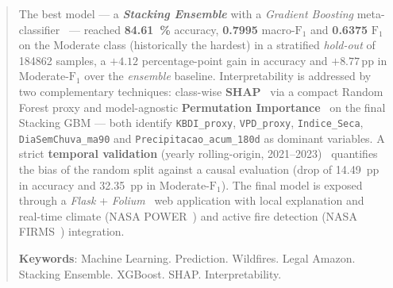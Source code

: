 \begin{abstract}
The best model --- a \textbf{\emph{Stacking Ensemble}} with a \emph{Gradient Boosting} meta-classifier~\cite{friedman2001greedy} --- reached \textbf{\SI{84.61}{\percent}} accuracy, \textbf{0.7995} macro-\(\text{F}_1\) and \textbf{0.6375} \(\text{F}_1\) on the Moderate class (historically the hardest) in a stratified \emph{hold-out} of \num{184862} samples, a \(+4.12\) percentage-point gain in accuracy and \(+8.77\,\text{pp}\) in Moderate-\(\text{F}_1\) over the \emph{ensemble} baseline. Interpretability is addressed by two complementary techniques: class-wise \textbf{SHAP}~\cite{lundberg2017unified,lundberg2020local} via a compact Random Forest proxy and model-agnostic \textbf{Permutation Importance}~\cite{breiman2001random,fisher2019all} on the final Stacking GBM --- both identify \texttt{KBDI\_proxy}, \texttt{VPD\_proxy}, \texttt{Indice\_Seca}, \texttt{DiaSemChuva\_ma90} and \texttt{Precipitacao\_acum\_180d} as dominant variables. A strict \textbf{temporal validation} (yearly rolling-origin, 2021--2023)~\cite{bergmeir2012cv} quantifies the bias of the random split against a causal evaluation (drop of \SI{14.49}{pp} in accuracy and \SI{32.35}{pp} in Moderate-\(\text{F}_1\)). The final model is exposed through a \emph{Flask} + \emph{Folium}~\cite{folium,leafletjs} web application with local explanation and real-time climate (NASA POWER~\cite{nasapower}) and active fire detection (NASA FIRMS~\cite{nasafirms}) integration.

\textbf{Keywords}: Machine Learning. Prediction. Wildfires. Legal Amazon. Stacking Ensemble. XGBoost. SHAP. Interpretability.
\end{abstract}
